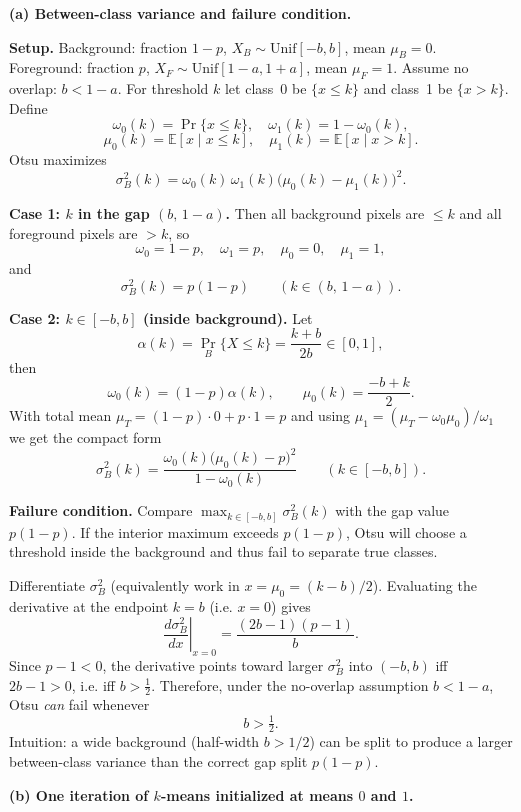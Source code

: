 \documentclass{article}
\begin{document}
\textbf{(a) Between-class variance and failure condition.}

\medskip

\noindent\textbf{Setup.} Background: fraction $1-p$, $X_B\sim\mathrm{Unif}[-b,b]$, mean $\mu_B=0$.
Foreground: fraction $p$, $X_F\sim\mathrm{Unif}[1-a,1+a]$, mean $\mu_F=1$.
Assume no overlap: $b<1-a$.
For threshold $k$ let class~0 be $\{x\le k\}$ and class~1 be $\{x>k\}$.
Define
\[
\omega_0(k)=\Pr\{x\le k\},\quad \omega_1(k)=1-\omega_0(k),
\]
\[
\mu_0(k)=\mathbb{E}[x\mid x\le k],\quad \mu_1(k)=\mathbb{E}[x\mid x>k].
\]
Otsu maximizes
\[
\sigma_B^2(k)=\omega_0(k)\,\omega_1(k)\big(\mu_0(k)-\mu_1(k)\big)^2.
\]

\medskip

\noindent\textbf{Case 1: $k$ in the gap $(b,\,1-a)$.}
Then all background pixels are $\le k$ and all foreground pixels are $>k$, so
\[
\omega_0=1-p,\quad \omega_1=p,\quad \mu_0=0,\quad \mu_1=1,
\]
and
\[
\boxed{\sigma_B^2(k)=p(1-p)\qquad (k\in(b,\,1-a)).}
\]

\medskip

\noindent\textbf{Case 2: $k\in[-b,b]$ (inside background).}
Let
\[
\alpha(k)=\Pr_B\{X\le k\}=\frac{k+b}{2b}\in[0,1],
\]
then
\[
\omega_0(k)=(1-p)\alpha(k),\qquad \mu_0(k)=\frac{-b+k}{2}.
\]
With total mean $\mu_T=(1-p)\cdot0+p\cdot1=p$ and using
$\mu_1=(\mu_T-\omega_0\mu_0)/\omega_1$ we get the compact form
\[
\boxed{\sigma_B^2(k)=\frac{\omega_0(k)\big(\mu_0(k)-p\big)^2}{1-\omega_0(k)}
\qquad (k\in[-b,b]).}
\]

\medskip

\noindent\textbf{Failure condition.}
Compare $\max_{k\in[-b,b]}\sigma_B^2(k)$ with the gap value $p(1-p)$.
If the interior maximum exceeds $p(1-p)$, Otsu will choose a threshold inside
the background and thus fail to separate true classes.

Differentiate $\sigma_B^2$ (equivalently work in $x=\mu_0=(k-b)/2$). Evaluating the
derivative at the endpoint $k=b$ (i.e. $x=0$) gives
\[
\left.\frac{d\sigma_B^2}{dx}\right|_{x=0}=\frac{(2b-1)(p-1)}{b}.
\]
Since $p-1<0$, the derivative points toward larger $\sigma_B^2$ into $(-b,b)$
iff $2b-1>0$, i.e. iff $b>\tfrac12$. Therefore, under the no-overlap assumption
$b<1-a$, Otsu \emph{can} fail whenever
\[
\boxed{b>\tfrac12.}
\]
Intuition: a wide background (half-width $b>1/2$) can be split to produce a
larger between-class variance than the correct gap split $p(1-p)$.

\newpage

\textbf{(b) One iteration of $k$-means initialized at means $0$ and $1$.}
\end{document}
